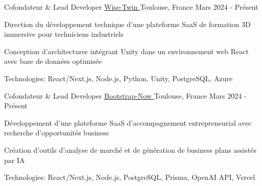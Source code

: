


\begin{cventries}


\cventry
{Cofondateur \& Lead Developer} %
{\href{https://www.wisetwin.eu}{Wise-Twin {\tiny\textcolor{black}{\faExternalLink}}}} %
{Toulouse, France} %
{Mars 2024 - Présent} %
{ %
\begin{cvitems}
\item {Direction du développement technique d'une plateforme SaaS de formation 3D immersive pour techniciens industriels}
\item {Conception d'architectures intégrant Unity dans un environnement web React avec base de données optimisée}
\item {Technologies: React/Next.js, Node.js, Python, Unity, PostgreSQL, Azure}
\end{cvitems}
}
\vspace{1.5em}


\cventry
{Cofondateur \& Lead Developer} %
{\href{https://www.bootstrap-now.com}{Bootstrap-Now {\tiny\textcolor{black}{\faExternalLink}}}} %
{Toulouse, France} %
{Mars 2024 - Présent} %
{ %
\begin{cvitems}
\item {Développement d'une plateforme SaaS d'accompagnement entrepreneurial avec recherche d'opportunités business}
\item {Création d'outils d'analyse de marché et de génération de business plans assistés par IA}
\item {Technologies: React/Next.js, Node.js, PostgreSQL, Prisma, OpenAI API, Vercel}
\end{cvitems}
}
\vspace{1.5em}


\end{cventries}

